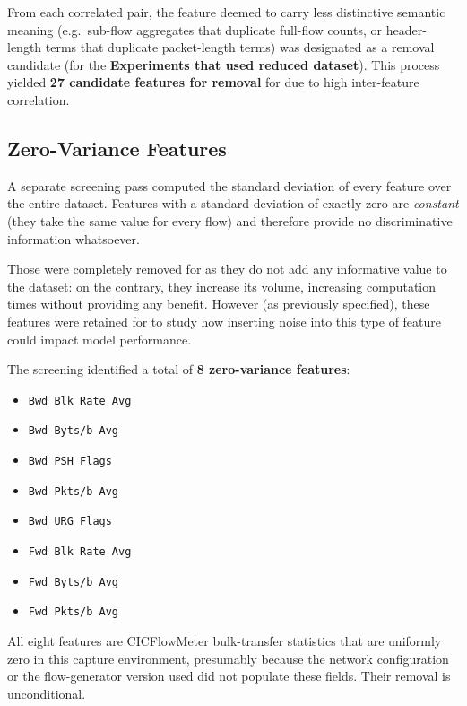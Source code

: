 \documentclass[../main.tex]{subfiles}
\begin{document}
From each correlated pair, the feature deemed to carry less distinctive semantic meaning (e.g.\ sub-flow aggregates that duplicate full-flow counts, or header-length terms that duplicate packet-length terms) was designated as a removal candidate (for the \textbf{Experiments that used reduced dataset}). This process yielded \textbf{27 candidate features for removal} for  due to high inter-feature correlation.

\subsection{Zero-Variance Features}
\label{sec:zero-variance}

A separate screening pass computed the standard deviation of every feature over the entire dataset.  Features with a standard deviation of exactly zero are \emph{constant} (they take the same value for every flow) and therefore provide no discriminative information whatsoever.  

Those were completely removed for  as they do not add any informative value to the dataset: on the contrary, they increase its volume, increasing computation times without providing any benefit. However (as previously specified), these features were retained for  to study how inserting noise into this type of feature could impact model performance.

The screening identified a total of \textbf{8 zero-variance features}:

\begin{itemize}
  \item \texttt{Bwd Blk Rate Avg}
  \item \texttt{Bwd Byts/b Avg}
  \item \texttt{Bwd PSH Flags}
  \item \texttt{Bwd Pkts/b Avg}
  \item \texttt{Bwd URG Flags}
  \item \texttt{Fwd Blk Rate Avg}
  \item \texttt{Fwd Byts/b Avg}
  \item \texttt{Fwd Pkts/b Avg}
\end{itemize}

All eight features are CICFlowMeter bulk-transfer statistics that are uniformly
zero in this capture environment, presumably because the network configuration
or the flow-generator version used did not populate these fields.  Their removal
is unconditional.
\end{document}
